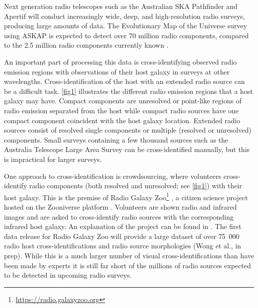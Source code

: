 \documentclass[fleqn,usenatbib,usedcolumn]{mnras}
\begin{document}
  Next generation radio telescopes such as the Australian SKA Pathfinder
  \citep[ASKAP;][]{johnston07} and Apertif \citep{verheijen08} will conduct
  increasingly wide, deep, and high-resolution radio surveys, producing large
  amounts of data. The Evolutionary Map of the Universe survey
  \citep[EMU;][]{norris11} using ASKAP is expected to detect over 70 million
  radio components, compared to the 2.5 million radio components currently
  known \citep{banfield15}.

  An important part of processing this data is cross-identifying observed
  radio emission regions with observations of their host galaxy in surveys at
  other wavelengths. Cross-identification of the host with an extended radio
  source can be a difficult task. \autoref{fig1} illustrates the different
  radio emission regions that a host galaxy may have. Compact components are
  unresolved or point-like regions of radio emission separated from the host
  while compact radio sources have one compact component coincident with the
  host galaxy location. Extended radio sources consist of resolved single
  components or multiple (resolved or unresolved) components. Small surveys
  containing a few thousand sources such as the Australia Telescope Large Area Survey
  \citep[ATLAS;][]{norris06,middelberg08} can be cross-identified manually,
  but this is impractical for larger surveys.

  One approach to cross-identification is crowdsourcing, where volunteers
  cross-identify radio components (both resolved and unresolved; see
  \autoref{fig1}) with their host galaxy. This is the premise of Radio Galaxy
  Zoo\footnote{\url{https://radio.galaxyzoo.org}} \citep{banfield15}, a
  citizen science project hosted on the Zooniverse platform \citep{lintott08}.
  Volunteers are shown radio and infrared images and are asked to
  cross-identify radio sources with the corresponding infrared host galaxy. An
  explanation of the project can be found in \citet{banfield15}. The first
  data release for Radio Galaxy Zoo will provide a large dataset of over
  75~000 radio host cross-identifications and radio source morphologies
  (Wong et al., in prep). While this is a much larger number of visual
  cross-identifications than have been made by experts \citep[e.g.,
  ][]{Taylor2007,Gendre2008,Grant2010,norris06,middelberg08} it is still far
  short of the millions of radio sources expected to be detected in upcoming
  radio surveys.
\end{document}
